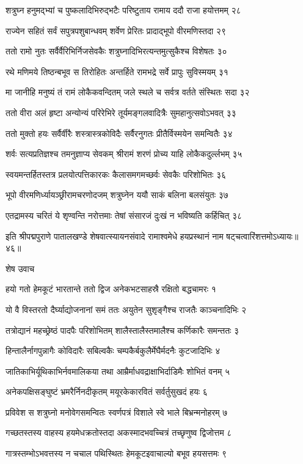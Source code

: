 शत्रुघ्न हनुमद्भ्यां च पुष्कलादिभिरुद्भटैः
परिष्टुताय रामाय ददौ राजा हयोत्तमम् २८

राज्येन सहितं सर्वं सपुत्रपशुबान्धवम्
शर्वेण प्रेरितः प्रादाद्भूपो वीरमणिस्तदा २९

ततो रामो नुतः सर्वैर्वैरिभिर्निजसेवकैः
शत्रुघ्नादिभिरत्यन्तमुत्सुकैश्च विशेषतः ३०

रथे मणिमये तिष्ठन्बभूव स तिरोहितः
अन्तर्हिते रामभद्रे सर्वे प्रापुः सुविस्मयम् ३१

मा जानीहि मनुष्यं तं रामं लोकैकवन्दितम्
जले स्थले च सर्वत्र वर्तते संस्थितः सदा ३२

ततो वीरा अलं हृष्टा अन्योन्यं परिरेभिरे
तूर्यमङ्गलवादित्रैः सुमहानुत्सवोऽभवत् ३३

ततो मुक्तो हयः सर्वैर्वीरैः शस्त्रास्त्रकोविदैः
सर्वैरनुगतः प्रीतैर्विस्मयेन समन्वितैः ३४

शर्वः सत्यप्रतिज्ञश्च तमनुज्ञाप्य सेवकम्
श्रीरामं शरणं प्रोच्य याहि लोकैकदुर्ल्लभम् ३५

स्वयमन्तर्हितस्तत्र प्रलयोत्पत्तिकारकः
कैलासमगमच्छर्वः सेवकैः परिशोभितः ३६

भूपो वीरमणिर्ध्यायञ्छ्रीरामचरणोदजम्
शत्रुघ्नेन ययौ साकं बलिना बलसंयुतः ३७

एतद्रामस्य चरितं ये शृण्वन्ति नरोत्तमाः
तेषां संसारजं दुःखं न भविष्यति कर्हिचित् ३८

इति श्रीपद्मपुराणे पातालखण्डे शेषवात्स्यायनसंवादे रामाश्वमेधे हयप्रस्थानं नाम षट्चत्वारिंशत्तमोऽध्यायः॥४६॥


शेष उवाच

हयो गतो हेमकूटं भारतान्ते ततो द्विज
अनेकभटसाहस्रै रक्षितो बद्धचामरः १

यो वै विस्तरतो दैर्घ्याद्योजनानां समं ततः
अयुतेन सुशृङ्गैश्च राजतैः काञ्चनादिभिः २

तत्रोद्यानं महच्छ्रेष्ठं पादपैः परिशोभितम्
शालैस्तालैस्तमालैश्च कर्णिकारैः समन्ततः ३

हिन्तालैर्नागपुन्नागैः कोविदारैः सबिल्वकैः
चम्पकैर्बकुलैर्मेघैर्मदनैः कुटजादिभिः ४

जातिकाभिर्यूथिकाभिर्नवमालिकया तथा
आम्रैर्माधवद्राक्षाभिर्दाडिमैः शोभितं वनम् ५

अनेकपक्षिसङ्घुष्टं भ्रमरैर्निनदीकृतम्
मयूरकेकारवितं सर्वर्तुसुखदं हयः ६

प्रविवेश स शत्रुघ्नो मनोवेगसमन्वितः
स्वर्णपत्रं विशाले स्वे भाले बिभ्रन्मनोहरम् ७

गच्छतस्तस्य वाहस्य हयमेधक्रतोस्तदा
अकस्मादभवच्चित्रं तच्छृणुष्व द्विजोत्तम ८

गात्रस्तम्भोऽभवत्तस्य न चचाल पथिस्थितः
हेमकूटइवाचाल्यो बभूव हयसत्तमः ९

